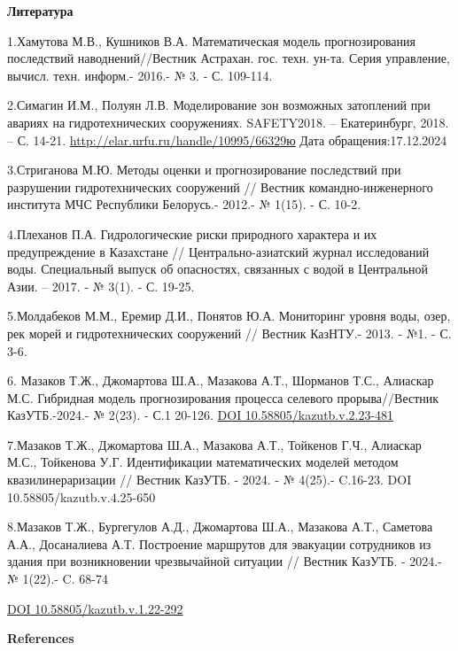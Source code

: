 \begin{center}
{\bfseries Литература}
\end{center}

\begin{references}
1.Хамутова М.В., Кушников В.А. Математическая модель прогнозирования
последствий наводнений//Вестник Астрахан. гос. техн. ун-та. Серия
управление, вычисл. техн. информ.- 2016.- № 3. - С. 109-114.

2.Симагин И.М., Полуян Л.В. Моделирование зон возможных затоплений при
авариях на гидротехнических сооружениях. SAFETY2018. -- Екатеринбург,
2018. -- С. 14-21. \url{http://elar.urfu.ru/handle/10995/66329ю} Дата
обращения:17.12.2024

3.Стриганова М.Ю. Методы оценки и прогнозирование последствий при
разрушении гидротехнических сооружений // Вестник командно-инженерного
института МЧС Республики Белорусь.- 2012.- № 1(15). - С. 10-2.

4.Плеханов П.А. Гидрологические риски природного характера и их
предупреждение в Казахстане // Центрально-азиатский журнал исследований
воды. Специальный выпуск об опасностях, связанных с водой в Центральной
Азии. -- 2017. - № 3(1). - С. 19-25.

5.Молдабеков М.М., Еремир Д.И., Понятов Ю.А. Мониторинг уровня воды,
озер, рек морей и гидротехнических сооружений // Вестник КазНТУ.- 2013.
- №1. - С. 3-6.

6. Мазаков Т.Ж., Джомартова Ш.А., Мазакова А.Т., Шорманов Т.С., Алиаскар
М.С. Гибридная модель прогнозирования процесса селевого прорыва//Вестник
КазУТБ.-2024.- № 2(23). - С.1 20-126.
\href{https://doi.org/10.58805/kazutb.v.2.23-481}{DOI
10.58805/kazutb.v.2.23-481}

7.Мазаков Т.Ж., Джомартова Ш.А., Мазакова А.Т., Тойкенов Г.Ч., Алиаскар
М.С., Тойкенова У.Г. Идентификации математических моделей методом
квазилинераризации // Вестник КазУТБ. - 2024. - № 4(25).- C.16-23. DOI
10.58805/kazutb.v.4.25-650

8.Мазаков Т.Ж., Бургегулов А.Д., Джомартова Ш.А., Мазакова А.Т.,
Саметова А.А., Досаналиева А.Т. Построение маршрутов для эвакуации
сотрудников из здания при возникновении чрезвычайной ситуации // Вестник
КазУТБ. - 2024.- № 1(22).- C. 68-74

\href{https://doi.org/10.58805/kazutb.v.1.22-292}{DOI
10.58805/kazutb.v.1.22-292}
\end{references}

\begin{center}
{\bfseries References}
\end{center}


